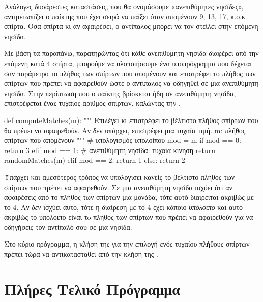 \documentclass[a4paper,11pt,oneside]{book}
\begin{document}
Ανάλογες δυσάρεστες καταστάσεις, που θα ονομάσουμε «ανεπιθύμητες νησίδες», αντιμετωπίζει ο παίκτης που έχει σειρά να παίξει όταν απομένουν 9, 13, 17, κ.ο.κ σπίρτα. Όσα σπίρτα κι αν αφαιρέσει, ο αντίπαλος μπορεί να τον στείλει στην επόμενη νησίδα.

Με βάση τα παραπάνω, παρατηρώντας ότι κάθε ανεπιθύμητη νησίδα διαφέρει από την επόμενη κατά 4 σπίρτα, μπορούμε να υλοποιήσουμε ένα υποπρόγραμμα που δέχεται σαν παράμετρο το πλήθος των σπίρτων που απομένουν και επιστρέφει το πλήθος των σπίρτων που πρέπει να αφαιρεθούν ώστε ο αντίπαλος να οδηγηθεί σε μια ανεπιθύμητη νησίδα. Στην περίπτωση που ο παίκτης βρίσκεται ήδη σε ανεπιθύμητη νησίδα, επιστρέφεται ένας τυχαίος αριθμός σπίρτων, καλώντας την . 

\begin{pycode}
def computeMatches(m):
    """ Επιλέγει κι επιστρέφει το βέλτιστο
    πλήθος σπίρτων που θα πρέπει να αφαιρεθούν. 
    Αν δεν υπάρχει, επιστρέφει μια τυχαία τιμή.
    m: πλήθος σπίρτων που απομένουν
    """
    # υπολογισμός υπολοίπου
    mod = m %
    if mod == 0:
        return 3
    elif mod == 1:
        # ανεπιθύμητη νησίδα: τυχαία κίνηση
        return randomMatches(m)
    elif mod == 2:
        return 1  
    else:
        return 2
\end{pycode}

Υπάρχει και αμεσότερος τρόπος να υπολογίσει κανείς το βέλτιστο πλήθος των σπίρτων που πρέπει να αφαιρεθούν.
Σε μια ανεπιθύμητη νησίδα ισχύει ότι αν αφαιρέσεις από το πλήθος των σπίρτων μια μονάδα, τότε αυτό διαιρείται ακριβώς με το 4. Αν \emph{δεν} ισχύει αυτό, τότε η διαίρεση με το 4 έχει κάποιο \emph{υπόλοιπο} και αυτό ακριβώς το υπόλοιπο είναι τo πλήθος των σπίρτων που πρέπει να αφαιρεθούν για να οδηγήσεις τον αντίπαλό σου σε μια νησίδα.


Στο κύριο πρόγραμμα, η κλήση της  για την επιλογή ενός τυχαίου πλήθους σπίρτων πρέπει τώρα να αντικατασταθεί από την κλήση της . %



\section{Πλήρες Τελικό Πρόγραμμα}
\end{document}
